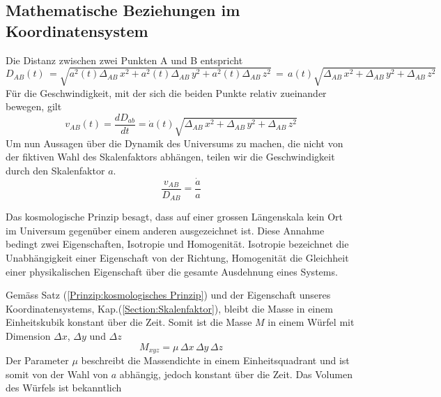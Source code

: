 \begin{refsection}
\subsection{Mathematische Beziehungen im Koordinatensystem \label{friedmann:Beziehungen im Koordinatensystem}}
Die Distanz zwischen zwei Punkten A und B entspricht 
\begin{equation}
D_{AB}(t)\, = \sqrt{a^2(t)\Delta_{AB}\,x^2 + a^2(t)\Delta_{AB}\,y^2 + a^2(t)\Delta_{AB}\,z^2}\, =\, a(t) \sqrt{\Delta_{AB}\,x^2 + \Delta_{AB}\,y^2 + \Delta_{AB}\,z^2}
\label{friedmann:Abstand}
\end{equation}
F\"{u}r die Geschwindigkeit, mit der sich die beiden Punkte relativ zueinander bewegen, gilt 
\begin{equation}
v_{AB}(t) = \dfrac{dD_{ab}}{dt} 
= \dot{a}(t) \sqrt{\Delta_{AB}\,x^2 + \Delta_{AB}\,y^2 + \Delta_{AB}\,z^2}
\label{friedmann:geschwindigkeit}
\end{equation}
Um nun Aussagen über die Dynamik des Universums zu machen, die nicht von der fiktiven Wahl des Skalenfaktors abhängen, teilen wir die Geschwindigkeit durch den Skalenfaktor $a$.
\begin{equation}
\frac{v_{AB} }{D_{AB}} = \frac{\dot{a}}{a}
\end{equation}
\begin{satz}
\label{Prinzip:kosmologisches Prinzip}
Das kosmologische Prinzip besagt, dass auf einer grossen Längenskala kein Ort im Universum gegenüber einem anderen ausgezeichnet ist. Diese Annahme bedingt zwei Eigenschaften, Isotropie und Homogenität. Isotropie  bezeichnet die Unabhängigkeit einer Eigenschaft von der Richtung, Homogenität die Gleichheit einer physikalischen Eigenschaft über die gesamte Ausdehnung eines Systems.
\end{satz}
Gemäss Satz (\ref{Prinzip:kosmologisches Prinzip}) und der Eigenschaft unseres Koordinatensystems, Kap.(\ref{Section:Skalenfaktor}), bleibt die Masse in einem Einheitskubik konstant über die Zeit. Somit ist die Masse $M$ in einem Würfel mit Dimension $\Delta x$, $\Delta y$ und $\Delta z$ 
\begin{equation}
M_{xyz} = \mu \,\Delta x \,\Delta y \,\Delta z
\end{equation}
Der Parameter $\mu$ beschreibt die Massendichte in einem Einheitsquadrant und ist somit von der Wahl von $a$ abhängig, jedoch konstant über die Zeit. Das Volumen des Würfels ist bekanntlich

\end{refsection}
